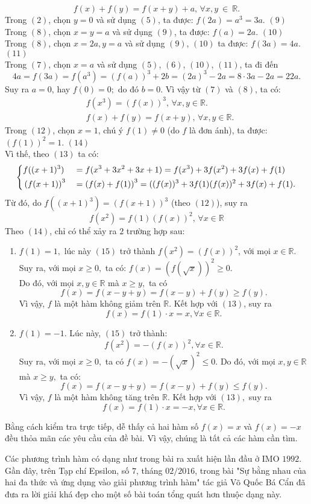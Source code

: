 \begin{bt}
{\[f(x)+f(y)=f(x+y)+a, \, \forall x,y\ \in \ \mathbb{R}.\tag{8}\]
	Trong $(2)$, chọn $y=0$ và sử dụng $(5)$, ta được: $f(2a)=a^3=3a.$ \hfill$(9)$\\
	Trong $(8)$, chọn $x=y=a$ và sử dụng $(9)$, ta được: $f(a)=2a.$ \hfill$(10)$\\
	Trong $(8)$, chọn $x=2a,y=a$ và sử dụng $(9)$, $(10)$ ta được: $f(3a)=4a$. \hfill$(11)$\\
	Trong $(7)$, chọn $x=a$ và sử dụng $(5)$, $(6)$, $(10)$, $(11)$, ta đi đến 
	$$4a=f(3a)=f(a^3)=\left(f(a)\right)^3+2b=(2a)^3-2a=8\cdot3a-2a=22a.$$
	Suy ra $a=0$, hay $f(0)=0;$ do đó $b=0$. Vì vậy từ $(7)$ và $(8)$, ta có: 
	{\allowdisplaybreaks
	\begin{align*}
	&f(x^3)=\left(f(x)\right)^3, \, \forall x,y \in  \mathbb{R}.\tag{12}\\
&f(x)+f(y)=f(x+y), \, \forall x,y  \in  \mathbb{R}.\tag{13}
\end{align*}}Trong $(12)$, chọn $x=1$, chú ý $f(1)\ne0$ (do $f$ là đơn ánh), ta được: 
	$\left(f(1)\right)^2=1$.	\hfill$(14)$\\
	Vì thế, theo $(13)$ ta có: 
	$$\left\{\begin{aligned}&f((x+1)^3)&&=f(x^3+3x^2+3x+1)=f(x^3)+3f(x^2)+3f(x)+f(1)\\&\left(f(x+1)\right)^3&&=\left(f(x)+f(1)\right)^3=((f(x))^3+3f(1)(f(x))^2+3f(x)+f(1).\end{aligned}\right.$$
	Từ đó, do $f((x+1)^3)=(f(x+1))^3$ (theo $(12)$), suy ra \[f(x^2)=f(1)(f(x))^2, \, \forall x \in \mathbb{R}\tag{15}\]
	Theo $(14)$, chỉ có thể xảy ra $2$ trường hợp sau:
	\begin{enumerate}[TH1:]
		\item $f(1)=1,$ lúc này $(15)$ trở thành $f(x^2)=(f(x))^2$, với mọi $x \in \mathbb{R}.$\\
		Suy ra, với mọi $x\ge0,$ ta có: $f(x)=(f(\sqrt{x}))^2 \ge0$.\\
		Do đó, với mọi $x,y\in \mathbb{R}$ mà $x\ge y,$ ta có $$f(x)=f(x-y+y)=f(x-y)+f(y)\ge f(y).$$
		Vì vậy, $f$ là một hàm không giảm trên $\mathbb{R}$. Kết hợp với $(13)$, suy ra 
		$$f(x)=f(1)\cdot x=x, \forall x \in \mathbb{R}.$$
		\item $f(1)=-1.$ Lúc này, $(15)$ trở thành: 
		$$f(x^2)=-(f(x))^2, \forall x \in \mathbb{R}.$$
		Suy ra, với mọi $x\ge0,$ ta có 
		$f(x)=-\left(\sqrt{x}\right)^2\le0.$
		Do đó, với mọi $x,y\in\mathbb{R}$ mà $x\ge y,$ ta có:
		$$f(x)=f(x-y+y)=f(x-y)+f(y)\le f(y).$$
		Vì vậy, $f$ là một hàm không tăng trên $\mathbb{R}$. Kết hợp với $(13),$ suy ra 
		$$f(x)=f(1)\cdot x=-x, \forall x \in \mathbb{R}.$$
\end{enumerate}
Bằng cách kiểm tra trực tiếp, dễ thấy cả hai hàm số $f(x)=x$ và $f(x)=-x$ đều thỏa mãn các yêu cầu của đề bài. Vì vậy, chúng là tất cả các hàm cần tìm.
\begin{nx}
	Các phương trình hàm có dạng như trong bài ra xuất hiện lần đầu ở IMO $1992$. Gần đây, trên Tạp chí Epsilon, số $7$, tháng $02/2016$, trong bài "Sự bằng nhau của hai đa thức và ứng dụng vào giải phương trình hàm" tác giả Võ Quốc Bá Cẩn đã đưa ra lời giải khá đẹp cho một số bài toán tổng quát hơn thuộc dạng này.   
\end{nx}
}
\end{bt}
